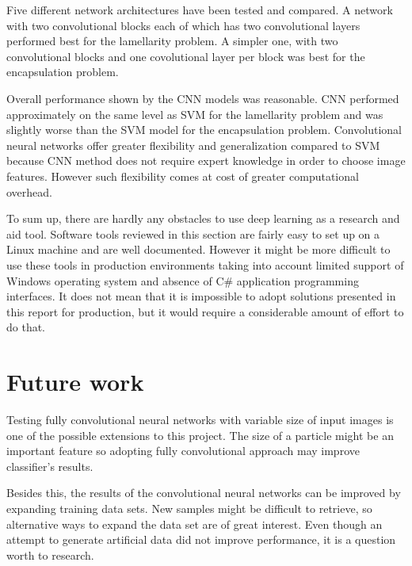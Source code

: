 \documentclass[a4paper, 11pt, table]{article}
\begin{document}
Five different network architectures have been tested and compared. A network with two convolutional blocks each of which has two convolutional layers performed best for the lamellarity problem. A simpler one, with two convolutional blocks and one covolutional layer per block was best for the encapsulation problem. 

Overall performance shown by the CNN models was reasonable. CNN performed approximately on the same level as SVM for the lamellarity problem and was slightly worse than the SVM model for the encapsulation problem. Convolutional neural networks offer greater flexibility and generalization compared to SVM because CNN method does not require expert knowledge in order to choose image features. However such flexibility comes at cost of greater computational overhead.

To sum up, there are hardly any obstacles to use deep learning as a
research and aid tool. Software tools reviewed in this section are fairly easy
to set up on a Linux machine and are well documented. However it might
be more difficult to use these tools in production environments taking into
account limited support of Windows operating system and absence of C\#
application programming interfaces. It does not mean that it is impossible to
adopt  solutions presented in this report for production, but it would require a
considerable amount of effort to do that.

\section{Future work}
Testing fully convolutional neural networks with variable size of input images is one of the possible extensions to this project. The size of a particle might be an important feature so adopting fully convolutional approach may improve classifier's results.

Besides this, the results of the convolutional neural networks can be improved by expanding training data sets. New samples might be difficult to retrieve, so alternative ways to expand the data set are of great interest. Even though an attempt to generate artificial data did not improve performance, it is a question worth to research.

\newpage
\printbibliography
\end{document}
